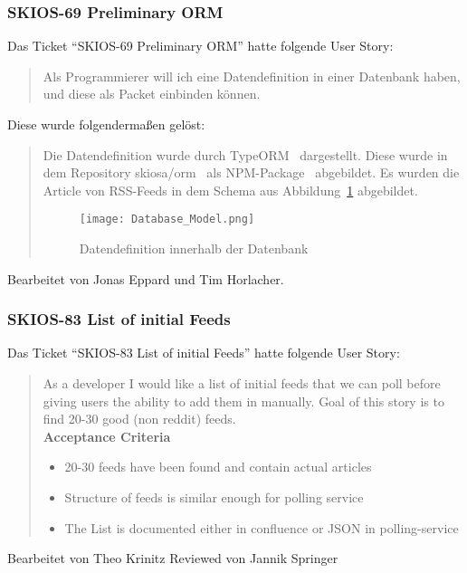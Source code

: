 \subsubsection{SKIOS-69 Preliminary ORM}
Das Ticket \enquote{SKIOS-69 Preliminary ORM} hatte folgende User Story:
\begin{quotation}
    Als Programmierer will ich eine Datendefinition in einer Datenbank
    haben, und diese als Packet einbinden können.
\end{quotation}
Diese wurde folgendermaßen gelöst:
\begin{quotation}
Die Datendefinition wurde durch TypeORM~\parencite{web/TypeORM} dargestellt.
Diese wurde in dem Repository skiosa/orm~\parencite{git/skiosa/orm} als NPM-Package~\parencite{web/npm} abgebildet.
Es wurden die Article von RSS-Feeds in dem Schema aus Abbildung~\ref{fig:databaseORM} abgebildet.
\begin{figure}
    \texttt{[image: Database\_Model.png]}
    \caption{Datendefinition innerhalb der Datenbank}
    \label{fig:databaseORM}
\end{figure}
\end{quotation}
Bearbeitet von Jonas Eppard und Tim Horlacher.

\subsubsection{SKIOS-83 List of initial Feeds}
Das Ticket \enquote{SKIOS-83 List of initial Feeds} hatte folgende User Story:
\begin{quotation}
    As a developer I would like a list of initial feeds that we can poll before giving users the ability to add them in manually. 
    Goal of this story is to find 20-30 good (non reddit) feeds.\\
    \textbf{Acceptance Criteria}
    \begin{itemize}
        \item 20-30 feeds have been found and contain actual articles
        \item Structure of feeds is similar enough for polling service 
        \item The List is documented either in confluence or JSON in polling-service
    \end{itemize}
\end{quotation}
Bearbeitet von Theo Krinitz
Reviewed von Jannik Springer

